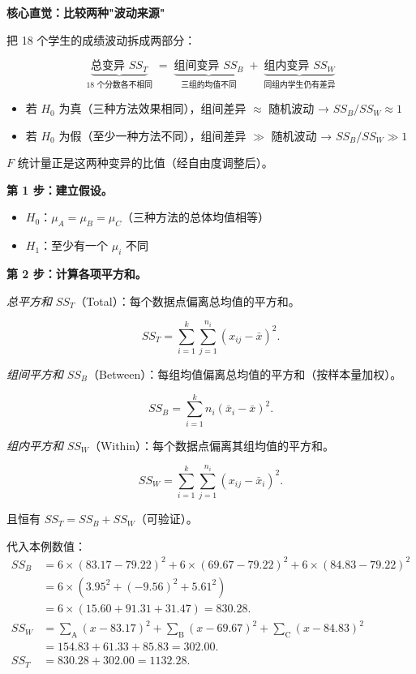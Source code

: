 \medskip
\textbf{核心直觉：比较两种"波动来源"}

把 18 个学生的成绩波动拆成两部分：

\[
\underbrace{\text{总变异 } SS_T}_{\text{18 个分数各不相同}}
\;=\;
\underbrace{\text{组间变异 } SS_B}_{\text{三组的均值不同}}
\;+\;
\underbrace{\text{组内变异 } SS_W}_{\text{同组内学生仍有差异}}
\]

\begin{itemize}
    \item 若 $H_0$ 为真（三种方法效果相同），组间差异 $\approx$ 随机波动 → $SS_B / SS_W \approx 1$
    \item 若 $H_0$ 为假（至少一种方法不同），组间差异 $\gg$ 随机波动 → $SS_B / SS_W \gg 1$
\end{itemize}

$F$ 统计量正是这两种变异的比值（经自由度调整后）。

\medskip
\textbf{第 1 步：建立假设。}

\begin{itemize}
    \item $H_0$：$\mu_A = \mu_B = \mu_C$（三种方法的总体均值相等）
    \item $H_1$：至少有一个 $\mu_i$ 不同
\end{itemize}

\textbf{第 2 步：计算各项平方和。}

\emph{总平方和} $SS_T$（Total）：每个数据点偏离总均值的平方和。

\begin{equation}
    SS_T = \sum_{i=1}^{k} \sum_{j=1}^{n_i} (x_{ij} - \bar{x})^2.
\end{equation}

\emph{组间平方和} $SS_B$（Between）：每组均值偏离总均值的平方和（按样本量加权）。

\begin{equation}
    SS_B = \sum_{i=1}^{k} n_i (\bar{x}_i - \bar{x})^2.
\end{equation}

\emph{组内平方和} $SS_W$（Within）：每个数据点偏离其组均值的平方和。

\begin{equation}
    SS_W = \sum_{i=1}^{k} \sum_{j=1}^{n_i} (x_{ij} - \bar{x}_i)^2.
\end{equation}

且恒有 $SS_T = SS_B + SS_W$（可验证）。

代入本例数值：
\begin{align}
    SS_B &= 6 \times (83.17 - 79.22)^2 + 6 \times (69.67 - 79.22)^2 + 6 \times (84.83 - 79.22)^2 \nonumber\\
         &= 6 \times (3.95^2 + (-9.56)^2 + 5.61^2) \nonumber\\
         &= 6 \times (15.60 + 91.31 + 31.47) = 830.28. \\[4pt]
    SS_W &= \sum_{\text{A}}(x - 83.17)^2 + \sum_{\text{B}}(x - 69.67)^2 + \sum_{\text{C}}(x - 84.83)^2 \nonumber\\
         &= 154.83 + 61.33 + 85.83 = 302.00. \\[4pt]
    SS_T &= 830.28 + 302.00 = 1132.28.
\end{align}

